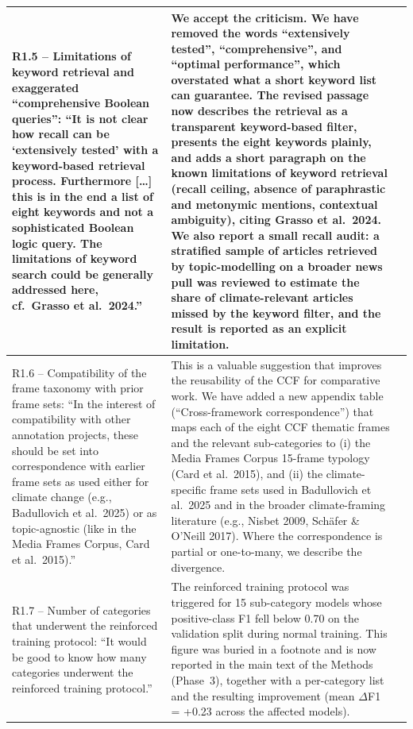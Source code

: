 \documentclass[11pt]{article}
\begin{document}
\begin{landscape}
\begin{longtable}{|L{4cm}|L{12cm}|L{9cm}|}
R1.5 -- Limitations of keyword retrieval and exaggerated \enquote{comprehensive Boolean queries}: \enquote{It is not clear how recall can be \enquote{extensively tested} with a keyword-based retrieval process. Furthermore [\dots] this is in the end a list of eight keywords and not a sophisticated Boolean logic query. The limitations of keyword search could be generally addressed here, cf.\ Grasso et al.\ 2024.} &
We accept the criticism. We have removed the words \enquote{extensively tested}, \enquote{comprehensive}, and \enquote{optimal performance}, which overstated what a short keyword list can guarantee. The revised passage now describes the retrieval as a transparent keyword-based filter, presents the eight keywords plainly, and adds a short paragraph on the known limitations of keyword retrieval (recall ceiling, absence of paraphrastic and metonymic mentions, contextual ambiguity), citing Grasso et al.\ 2024. We also report a small recall audit: a stratified sample of articles retrieved by topic-modelling on a broader news pull was reviewed to estimate the share of climate-relevant articles missed by the keyword filter, and the result is reported as an explicit limitation. &
\\
\hline

R1.6 -- Compatibility of the frame taxonomy with prior frame sets: \enquote{In the interest of compatibility with other annotation projects, these should be set into correspondence with earlier frame sets as used either for climate change (e.g., Badullovich et al.\ 2025) or as topic-agnostic (like in the Media Frames Corpus, Card et al.\ 2015).} &
This is a valuable suggestion that improves the reusability of the CCF for comparative work. We have added a new appendix table (\enquote{Cross-framework correspondence}) that maps each of the eight CCF thematic frames and the relevant sub-categories to (i) the Media Frames Corpus 15-frame typology (Card et al.\ 2015), and (ii) the climate-specific frame sets used in Badullovich et al.\ 2025 and in the broader climate-framing literature (e.g., Nisbet 2009, Schäfer \& O'Neill 2017). Where the correspondence is partial or one-to-many, we describe the divergence. &
\\
\hline

R1.7 -- Number of categories that underwent the reinforced training protocol: \enquote{It would be good to know how many categories underwent the reinforced training protocol.} &
The reinforced training protocol was triggered for 15 sub-category models whose positive-class F1 fell below 0.70 on the validation split during normal training. This figure was buried in a footnote and is now reported in the main text of the Methods (Phase~3), together with a per-category list and the resulting improvement (mean $\Delta$F1 = +0.23 across the affected models). &
\\
\hline


\end{longtable}
\end{landscape}
\end{document}
